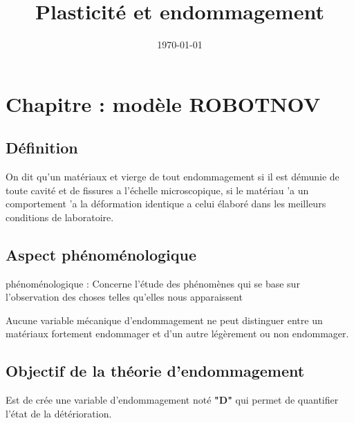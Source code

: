 \documentclass[12pt,a4paper]{report}
\title{Plasticité et endommagement}
\author{}
\date{\today}
\newcommand{\RomanNum}[1] %
{\MakeUppercase{\romannumeral #1}}
\begin{document}
	
	
	\maketitle
	
	\tableofcontents
	
	\newpage
	
	
	
	
	
	
	\chapter{Chapitre \RomanNum{1} : modèle ROBOTNOV}
	
	\section{Définition}
	
	On dit qu'un matériaux et vierge de tout endommagement si il est démunie de toute cavité et de fissures a l'échelle microscopique,
	si le matériau 'a un comportement 'a la déformation identique a celui élaboré dans les meilleurs conditions de laboratoire.
	
	\section{Aspect phénoménologique}
	
	phénoménologique : Concerne l'étude des phénomènes qui se base sur l'observation des choses telles qu'elles nous apparaissent
	
	\vspace{\baselineskip}
	
	Aucune variable mécanique d'endommagement ne peut distinguer entre un matériaux fortement endommager et d'un autre légèrement ou non endommager.
	
	\section{Objectif de la théorie d'endommagement}
	
	Est de crée une variable d'endommagement noté \textbf{"D"} qui permet de quantifier l'état de la détérioration.
	
\end{document}
